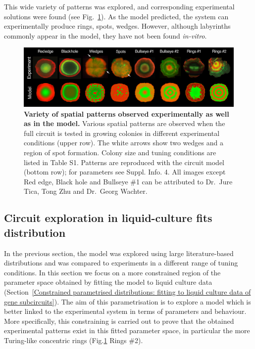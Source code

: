 This wide variety of patterns was explored, and corresponding experimental solutions were found (see Fig.~\ref{comparison_colonies_model_vs_experiment}).
As the model predicted, the system can experimentally produce rings, spots, wedges.
However, although labyrinths commonly appear in the model, they have not been found \textit{in-vitro}.


\begin{figure}[H]
    \centering

    \includegraphics[width=1\textwidth]{chapters/Chapter 3/comparison_colonies_model_vs_experiment}
    \caption{\textbf{Variety of spatial patterns observed experimentally as well as in the model.} Various spatial patterns are observed when the full circuit is tested in growing colonies in different experimental conditions (upper row). The white arrows show two wedges and a region of spot formation. Colony size and tuning conditions are listed in Table S1. Patterns are reproduced with the circuit model (bottom row); for parameters see Suppl. Info. 4. All images except Red edge, Black hole and Bullseye \#1 can be attributed to Dr.~Jure Tica, Tong Zhu and Dr.~Georg Wachter.}
    \label{comparison_colonies_model_vs_experiment}
\end{figure}

\subsection{Circuit exploration in liquid-culture fits distribution}
In the previous section, the model was explored using large literature-based distributions and was compared to experiments in a different range of tuning conditions.
In this section we focus on a more constrained region of the parameter space obtained by fitting the model to liquid culture data (Section~\ref{Constrained parametrised distributions: fitting to liquid culture data of gene subcircuits}).
The aim of this parametrisation is to explore a model which is better linked to the experimental system in terms of parameters and behaviour.
More specifically, this constraining is carried out to prove that the obtained experimental patterns exist in this fitted parameter space, in particular the more Turing-like concentric rings (Fig.\ref{comparison_colonies_model_vs_experiment} Rings \#2).


